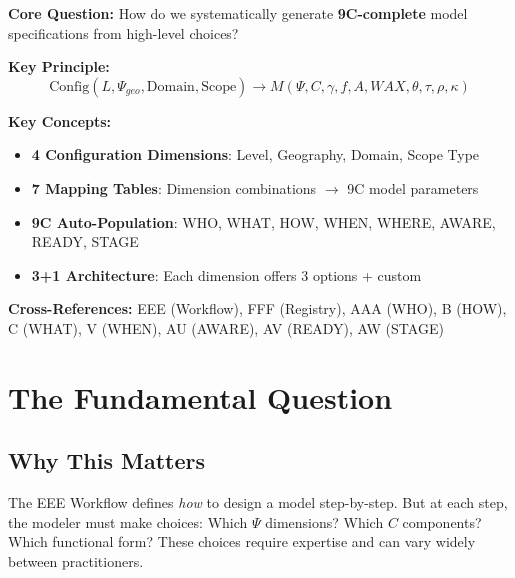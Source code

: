 \begin{tcolorbox}[colback=blue!5!white, colframe=blue!75!black,
    title=Quick Reference: Model Configurator (9C Complete)]

\textbf{Core Question:} How do we systematically generate \textbf{9C-complete} model specifications from high-level choices?

\textbf{Key Principle:}
\begin{equation}
\text{Config}(L, \Psi_{geo}, \text{Domain}, \text{Scope}) \rightarrow M(\Psi, C, \gamma, f, A, WAX, \theta, \tau, \rho, \kappa)
\end{equation}

\textbf{Key Concepts:}
\begin{itemize}[nosep]
\item \textbf{4 Configuration Dimensions}: Level, Geography, Domain, Scope Type
\item \textbf{7 Mapping Tables}: Dimension combinations $\rightarrow$ 9C model parameters
\item \textbf{9C Auto-Population}: WHO, WHAT, HOW, WHEN, WHERE, AWARE, READY, STAGE
\item \textbf{3+1 Architecture}: Each dimension offers 3 options + custom
\end{itemize}

\textbf{Cross-References:} EEE (Workflow), FFF (Registry), AAA (WHO), B (HOW), C (WHAT), V (WHEN), AU (AWARE), AV (READY), AW (STAGE)
\end{tcolorbox}



\section{The Fundamental Question}
\label{sec:ggg-fundamental}

\subsection{Why This Matters}

The EEE Workflow defines \textit{how} to design a model step-by-step. But at each
step, the modeler must make choices: Which $\Psi$ dimensions? Which $C$ components?
Which functional form? These choices require expertise and can vary widely between
practitioners.

